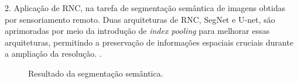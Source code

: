 \documentclass[%
  10pt,%
  aspectratio = 169,%
  compress,%
  t,%
  english,%
  brazilian,%
  tikz,
]{beamer}
\begin{document}
\begin{frame}
    2. Aplicação de RNC, na tarefa de segmentação semântica de imagens obtidas por sensoriamento remoto. Duas arquiteturas de RNC, SegNet e U-net, são aprimoradas por meio da introdução de \textit{index pooling} para melhorar essas arquiteturas, permitindo a preservação de informações espaciais cruciais durante a ampliação da resolução. \textbf{\cite{Alam2021}}.
    \begin{figure}[!htb]
        \centering%
        \caption{Resultado da segmentação semântica.}%
        \label{fig:alam2021}
    \end{figure}
    
\end{frame}
\end{document}
